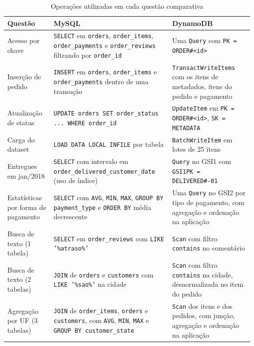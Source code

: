 \documentclass[12pt]{article}
\newcommand{\cod}[1]{\texttt{#1}}
\begin{document}
\begin{table}[htbp]
\centering
\caption{Operações utilizadas em cada questão comparativa}
\label{tab:padroes}
\footnotesize
\begin{tabularx}{\textwidth}{|>{\raggedright\arraybackslash}p{2.7cm}|L|L|}
\hline
\textbf{Questão} & \textbf{MySQL} & \textbf{DynamoDB} \\ \hline
Acesso por chave & \cod{SELECT} em \cod{orders}, \cod{order\_items}, \cod{order\_payments} e \cod{order\_reviews} filtrando por \cod{order\_id} & Uma \cod{Query} com \cod{PK = ORDER\#<id>} \\ \hline
Inserção de pedido & \cod{INSERT} em \cod{orders}, \cod{order\_items} e \cod{order\_payments} dentro de uma transação & \cod{TransactWriteItems} com os itens de metadados, itens do pedido e pagamento \\ \hline
Atualização de status & \cod{UPDATE orders SET order\_status ... WHERE order\_id} & \cod{UpdateItem} em \cod{PK = ORDER\#<id>}, \cod{SK = METADATA} \\ \hline
Carga do dataset & \cod{LOAD DATA LOCAL INFILE} por tabela & \cod{BatchWriteItem} em lotes de 25 itens \\ \hline
Entregues em jan/2018 & \cod{SELECT} com intervalo em \cod{order\_delivered\_\allowbreak customer\_date} (uso de índice) & \cod{Query} no GSI1 com \cod{GSI1PK = DELIVERED\#-01} \\ \hline
Estatísticas por forma de pagamento & \cod{SELECT} com \cod{AVG}, \cod{MIN}, \cod{MAX}, \cod{GROUP BY payment\_type} e \cod{ORDER BY} média decrescente & Uma \cod{Query} no GSI2 por tipo de pagamento, com agregação e ordenação na aplicação \\ \hline
Busca de texto (1 tabela) & \cod{SELECT} em \cod{order\_reviews} com \cod{LIKE '\%atraso\%'} & \cod{Scan} com filtro \cod{contains} no comentário \\ \hline
Busca de texto (2 tabelas) & \cod{JOIN} de \cod{orders} e \cod{customers} com \cod{LIKE '\%sao\%'} na cidade & \cod{Scan} com filtro \cod{contains} na cidade, desnormalizada no item do pedido \\ \hline
Agregação por UF (3 tabelas) & \cod{JOIN} de \cod{order\_items}, \cod{orders} e \cod{customers}, com \cod{AVG}, \cod{MIN}, \cod{MAX} e \cod{GROUP BY customer\_state} & \cod{Scan} dos itens e dos pedidos, com junção, agregação e ordenação na aplicação \\ \hline
\end{tabularx}
\end{table}
\end{document}
